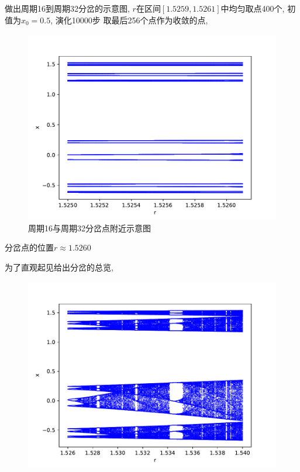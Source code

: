 \documentclass[a4paper,zihao=5,UTF8]{ctexart}
\begin{document}
    \par 
    做出周期16到周期32分岔的示意图, $r$在区间$[1.5259,1.5261]$中均匀取点400个, 初值为$x_0 = 0.5$, 演化10000步
    取最后256个点作为收敛的点,
    \begin{figure}[htbp]
        \centering
        \includegraphics[scale=0.5]{9_3_5.pdf}
        \caption{周期16与周期32分岔点附近示意图}
    \end{figure}
    \par 
    分岔点的位置$r \approx 1.5260$
    \par 为了直观起见给出分岔的总览,
    \begin{figure}
        \centering
        \includegraphics[scale=0.5]{9_3_another.pdf}
    \end{figure}
\end{document}
